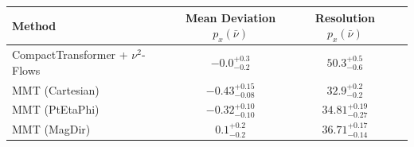     \begin{tabular}{lccc}
        \toprule
        Method & Mean Deviation $p_{x}(\bar{\nu})$ & Resolution $p_{x}(\bar{\nu})$ \\
        \midrule
        CompactTransformer + $\nu^2$-Flows & $-0.0^{+0.3}_{-0.2}$ & $50.3^{+0.5}_{-0.6}$ \\
        MMT (Cartesian) & $-0.43^{+0.15}_{-0.08}$ & $32.9^{+0.2}_{-0.2}$ \\
        MMT (PtEtaPhi) & $-0.32^{+0.10}_{-0.10}$ & $34.81^{+0.19}_{-0.27}$ \\
        MMT (MagDir) & $0.1^{+0.2}_{-0.2}$ & $36.71^{+0.17}_{-0.14}$ \\
        \bottomrule
    \end{tabular}